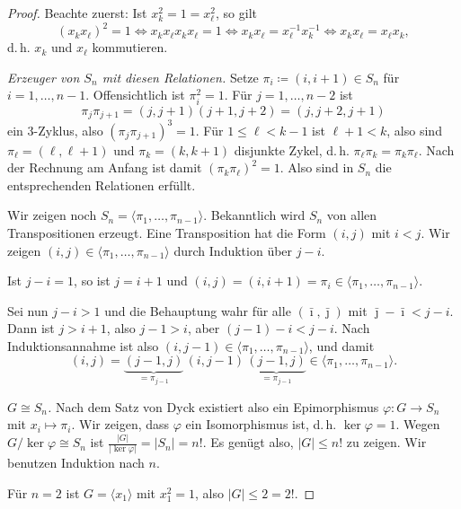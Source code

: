 \documentclass[11pt]{article}
\begin{document}
\begin{proof}
  Beachte zuerst: Ist $x_k^2 = 1 = x_\ell^2$, so gilt
  \[ (x_k x_\ell)^2 = 1 \iff x_k x_\ell x_k x_\ell = 1 \iff x_k x_\ell = x_\ell^{-1} x_k^{-1} \iff x_k x_\ell = x_\ell x_k, \]
  d.\,h. $x_k$ und $x_\ell$ kommutieren.

  \textit{Erzeuger von $S_n$ mit diesen Relationen.} Setze $\pi_i \coloneqq (i, i+1) \in S_n$ für $i = 1, \dots, n-1$. Offensichtlich ist $\pi_i^2 = 1$. Für $j = 1, \dots, n-2$ ist
  \[ \pi_j \pi_{j+1} = (j, j+1)(j+1, j+2) = (j, j+2, j+1) \]
  ein 3-Zyklus, also $(\pi_j \pi_{j+1})^3 = 1$. Für $1 \le \ell < k - 1$ ist $\ell + 1 < k$, also sind $\pi_\ell = (\ell, \ell+1)$ und $\pi_k = (k, k+1)$ disjunkte Zykel, d.\,h. $\pi_\ell \pi_k = \pi_k \pi_\ell$. Nach der Rechnung am Anfang ist damit $(\pi_k \pi_\ell)^2 = 1$. Also sind in $S_n$ die entsprechenden Relationen erfüllt.

  Wir zeigen noch $S_n = \langle \pi_1, \dots, \pi_{n-1} \rangle$. Bekanntlich wird $S_n$ von allen Transpositionen erzeugt. Eine Transposition hat die Form $(i, j)$ mit $i < j$. Wir zeigen $(i, j) \in \langle \pi_1, \dots, \pi_{n-1} \rangle$ durch Induktion über $j - i$.

  Ist $j - i = 1$, so ist $j = i + 1$ und $(i, j) = (i, i+1) = \pi_i \in \langle \pi_1, \dots, \pi_{n-1} \rangle$.

  Sei nun $j - i > 1$ und die Behauptung wahr für alle $(\bar{\imath}, \bar{\jmath})$ mit $\bar{\jmath} - \bar{\imath} < j - i$. Dann ist $j > i + 1$, also $j - 1 > i$, aber $(j - 1) - i < j - i$. Nach Induktionsannahme ist also $(i, j-1) \in \langle \pi_1, \dots, \pi_{n-1} \rangle$, und damit
  \[ (i, j) = \underbrace{(j-1, j)}_{= \pi_{j-1}}\, (i, j-1)\, \underbrace{(j-1, j)}_{= \pi_{j-1}} \in \langle \pi_1, \dots, \pi_{n-1} \rangle. \]


  \textit{$G \cong S_n$.} Nach dem Satz von Dyck existiert also ein Epimorphismus $\varphi\colon G \to S_n$ mit $x_i \mapsto \pi_i$. Wir zeigen, dass $\varphi$ ein Isomorphismus ist, d.\,h. $\ker\varphi = 1$. Wegen $G/\ker\varphi \cong S_n$ ist $\frac{\lvert G \rvert}{\lvert \ker\varphi \rvert} = \lvert S_n \rvert = n!$. Es genügt also, $\lvert G \rvert \le n!$ zu zeigen. Wir benutzen Induktion nach $n$.

  Für $n = 2$ ist $G = \langle x_1 \rangle$ mit $x_1^2 = 1$, also $\lvert G \rvert \le 2 = 2!$.


\end{proof}
\end{document}
